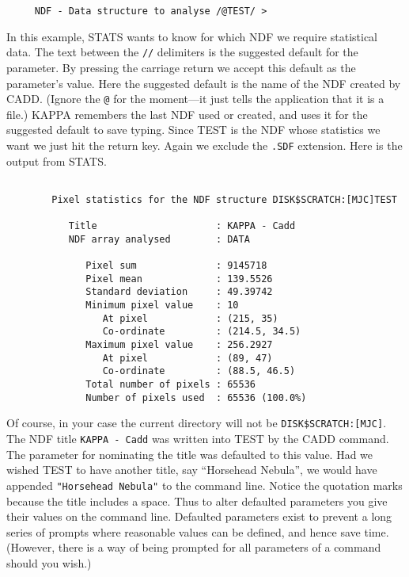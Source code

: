 \small
\begin{verbatim}
     NDF - Data structure to analyse /@TEST/ >
\end{verbatim}
\normalsize

In this example, STATS wants to know for which NDF we require
statistical data.  The text between the {\tt //} delimiters is the
suggested default for the parameter.  By pressing the carriage
return we accept this default as the parameter's value.
Here the suggested default is the name of the NDF
created by CADD.  (Ignore the {\tt @} for the moment---it just tells
the application that it is a file.)
{\small KAPPA} remembers the last NDF used or created, and uses it
for the suggested default to save typing.  Since TEST is the NDF
whose statistics we want we just hit the return key. Again we exclude the
{\tt .SDF} extension.  Here is the output from STATS.

\small
\begin{verbatim}

        Pixel statistics for the NDF structure DISK$SCRATCH:[MJC]TEST

           Title                     : KAPPA - Cadd
           NDF array analysed        : DATA

              Pixel sum              : 9145718
              Pixel mean             : 139.5526
              Standard deviation     : 49.39742
              Minimum pixel value    : 10
                 At pixel            : (215, 35)
                 Co-ordinate         : (214.5, 34.5)
              Maximum pixel value    : 256.2927
                 At pixel            : (89, 47)
                 Co-ordinate         : (88.5, 46.5)
              Total number of pixels : 65536
              Number of pixels used  : 65536 (100.0%)

\end{verbatim}
\normalsize

Of course, in your case the current directory will not be
{\tt DISK\$SCRATCH:[MJC]}.
The NDF title {\tt KAPPA - Cadd} was written into TEST by the
CADD command.  The parameter for nominating the title was defaulted
to this value.  Had we wished TEST to have another title, say
``Horsehead Nebula'', we would have appended {\tt "Horsehead Nebula"}
to the command line.  Notice the quotation marks because the title
includes a space.  Thus to alter defaulted parameters you give their
values on the command line.  Defaulted parameters exist to prevent a
long series of prompts where reasonable values can be defined, and hence
save time. (However, there is a way of being prompted for all parameters
of a command should you wish.)

